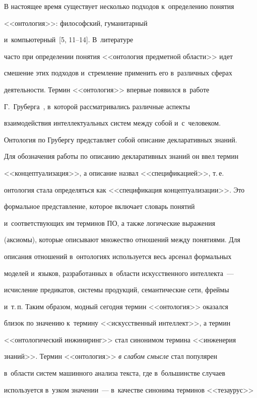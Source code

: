   


  В настоящее время существует несколько подходов к~определению понятия 


<<онтология>>: философский, гуманитарный 


   и~компьютерный~[5, 11--14]. В~литературе 


часто при определении понятия <<онтология предметной области>> идет 


смешение этих подходов и~стремление применить его в~различных сферах 


деятельности. Термин <<онтология>> впервые появился в~работе 


Г.~Груберга~\cite{15-rod}, в~которой рассматривались различные аспекты 


взаимодействия интеллектуальных систем между собой и~с~человеком. 


Онтология по Грубергу представляет собой описание декларативных знаний. 


Для обозначения работы по описанию декларативных знаний он ввел термин 


<<концептуализация>>, а описание назвал <<спецификацией>>, т.\,е.\ 


онтология стала определяться как <<спецификация концептуализации>>. Это 


формальное представление, которое включает словарь понятий 


и~соответствующих им терминов ПО, а также логические выражения 


(аксиомы), которые описывают множество отношений между понятиями. Для 


описания отношений в~онтологиях используется весь арсенал формальных 


моделей и~языков, разработанных в~области искусственного интеллекта~--- 


исчисление предикатов, системы продукций, семантические сети, фреймы 


и~т.\,п. Таким образом, модный сегодня термин <<онтология>> оказался 


близок по значению к~термину <<искусственный интеллект>>, а термин 


<<онтологический инжиниринг>> стал синонимом термина <<инженерия 


знаний>>. Термин <<онтология>> \textit{в слабом смысле} стал популярен 


в~области систем машинного анализа текста, где в~большинстве случаев 


используется в~узком значении~--- в~качестве синонима терминов <<тезаурус>> 



